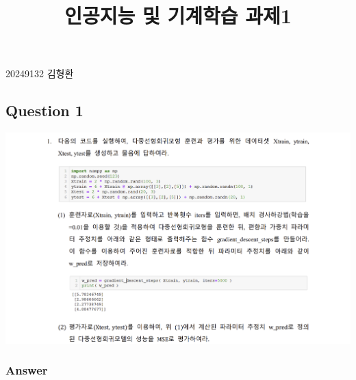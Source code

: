 \documentclass[
  letterpaper,
  DIV=11,
  numbers=noendperiod]{scrartcl}
\title{인공지능 및 기계학습 과제1}
\author{}
\date{}
\begin{document}
\maketitle

20249132 김형환

\subsection{Question 1}\label{question-1}

\includegraphics{image/machine_hw1_1.png}

\subsubsection{Answer}\label{answer}
\end{document}
